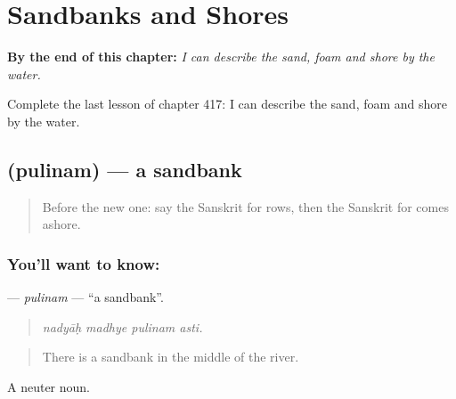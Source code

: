 
\chapter{Sandbanks and Shores}
\label{ch:sa-sandbanks-and-shores}

\begin{chapteropening}
\textbf{By the end of this chapter:} \emph{I can describe the sand, foam and shore by the water.}

Complete the last lesson of chapter 417: I can describe the sand, foam and shore by the water.
\end{chapteropening}

\section[\texorpdfstring{\sk{पुलिनम्} (pulinam)}{पुलिनम् (pulinam)}]{ (pulinam) — a sandbank}

\label{lesson:SA-C417-pulinam}



\begin{quote}
Before the new one: say the Sanskrit for rows, then the Sanskrit for comes ashore.
\end{quote}

\subsection*{You'll want to know: }
\textbf{} — \emph{pulinam} — \textquotedblleft{}a sandbank\textquotedblright{}.

\begin{quote}
   
\end{quote}

\begin{quote}
\emph{nadyāḥ madhye pulinam asti.}
\end{quote}

\begin{quote}
There is a sandbank in the middle of the river.
\end{quote}

A neuter noun.


